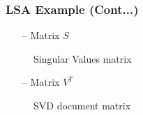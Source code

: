 \documentclass{beamer}
\begin{document}
\begin{frame}[noframenumbering]
\frametitle{LSA Example (Cont...)}

\begin{itemize}
\item[--] Matrix $S$
\end{itemize}
\begin{figure}[h] 
\centering
{}
\centering
\caption{Singular Values matrix}
\label{Singular_LSA}
\end{figure}

\begin{itemize}
\item[--] Matrix $V^T$
\end{itemize}
\begin{figure}[h] 
\centering
{}
\centering
\caption{SVD document matrix}
\label{VT_LSA}
\end{figure}

\end{frame}
\end{document}
